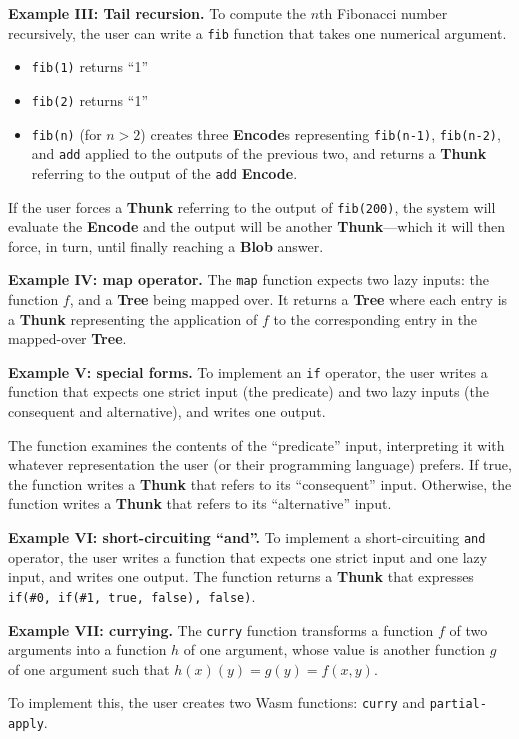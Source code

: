 \documentclass{article}
\newcommand{\blob}{\textbf{Blob}\xspace}
\newcommand{\encode}{\textbf{Encode}\xspace}
\newcommand{\thunk}{\textbf{Thunk}\xspace}
\newcommand{\encodes}{\textbf{Encode}s\xspace}
\newcommand{\tree}{\textbf{Tree}\xspace}
\begin{document}
\textbf{Example III: Tail recursion.} To compute the $n$th Fibonacci number
recursively, the user can write a \texttt{fib} function that
takes one numerical argument.
\begin{itemize}[itemsep=0pt]
\item \texttt{fib(1)} returns ``1''
\item \texttt{fib(2)} returns ``1''
  \item \texttt{fib(n)} (for $n>2$) creates three \encodes
    representing \texttt{fib(n-1)}, \texttt{fib(n-2)}, and
    \texttt{add} applied to the outputs of the previous two, and
    returns a \thunk referring to the output of the \texttt{add}
    \encode.
    \end{itemize}

If the user forces a \thunk referring to the output of \texttt{fib(200)}, the system will
evaluate the \encode and the output will be another \thunk---which it will then force, in turn,
until finally reaching a \blob answer.

\textbf{Example IV: map operator.} The \texttt{map} function expects
two lazy inputs: the function $f$, and a \tree being mapped over.  It
returns a \tree where each entry is a \thunk representing the application of $f$ to the corresponding
entry in the mapped-over \tree.

\textbf{Example V: special forms.} To implement an \texttt{if}
operator, the user writes a function that expects one strict
input (the predicate) and two lazy inputs (the consequent and
alternative), and writes one output.

The function examines the contents of the ``predicate'' input,
interpreting it with whatever representation the user (or their
programming language) prefers. If true, the function writes a \thunk
that refers to its ``consequent'' input. Otherwise, the function
writes a \thunk that refers to its ``alternative'' input.

\textbf{Example VI: short-circuiting ``and''.} To implement a
short-circuiting \texttt{and} operator, the user writes a function
that expects one strict input and one lazy input, and writes
one output. The function returns a \thunk that expresses \texttt{if(\#0,
  if(\#1, true, false), false)}.

\textbf{Example VII: currying.} The \texttt{curry} function transforms
a function $f$ of two arguments into a function $h$ of one argument,
whose value is another function $g$ of one argument such that $h(x)(y) =
g(y) = f(x,y)$.

To implement this, the user creates two Wasm functions: \texttt{curry} and \texttt{partial-apply}.
\end{document}

